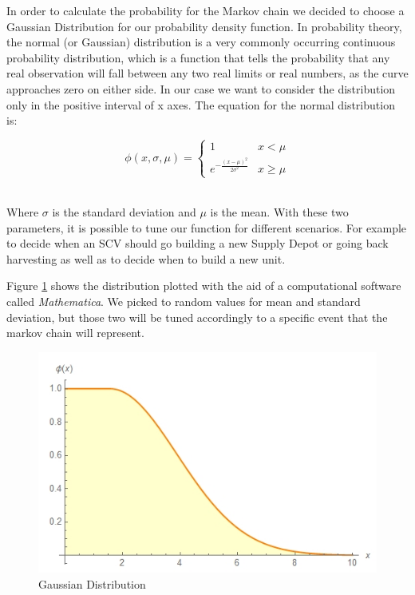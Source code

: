 In order to calculate the probability for the Markov chain we decided to choose a Gaussian Distribution for our probability density function. In probability theory, the normal (or Gaussian) distribution is a very commonly occurring continuous probability distribution, which is a function that tells the probability that any real observation will fall between any two real limits or real numbers, as the curve approaches zero on either side. In our case we want to consider the distribution only in the positive interval of x axes. The equation for the normal distribution is:

\begin{center}
\begin{equation}
\phi (x,\sigma,\mu) = 	\begin{cases}
							1 & x < \mu \\
							e^{-\frac{(x-\mu )^2}{2 \sigma ^2}} & x \geq \mu
						\end{cases}
\end{equation}

\end{center}
~\\
Where $\sigma$ is the standard deviation and $\mu$ is the mean. With these two parameters, it is possible to tune our function for different scenarios. For example to decide when an SCV should go building a new Supply Depot or going back harvesting as well as to decide when to build a new unit. 

Figure \ref{fig:gaussdistr} shows the distribution plotted with the aid of a computational software called \textit{Mathematica}. We picked to random values for mean and standard deviation, but those two will be tuned accordingly to a specific event that the markov chain will represent.

\begin{figure}[h]
\caption{Gaussian Distribution}
\centering
\label{fig:gaussdistr}
\includegraphics[scale=0.7]{images/Gaussian_Distribution.jpg}
\end{figure}
